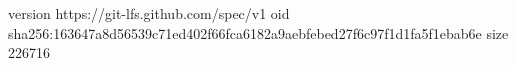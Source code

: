version https://git-lfs.github.com/spec/v1
oid sha256:163647a8d56539c71ed402f66fca6182a9aebfebed27f6c97f1d1fa5f1ebab6e
size 226716

